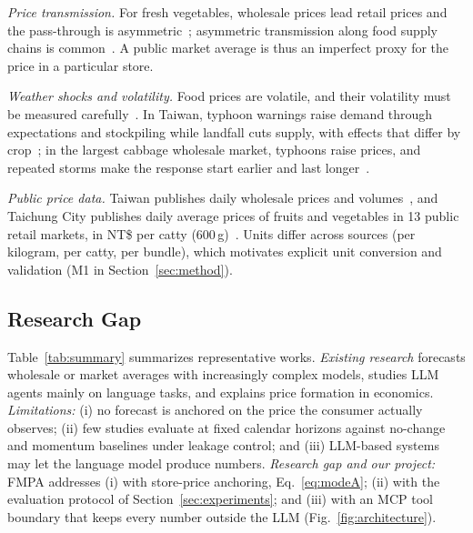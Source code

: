 \textit{Price transmission.} For fresh vegetables, wholesale prices lead retail
prices and the pass-through is asymmetric~\cite{ward1982asymmetry}; asymmetric
transmission along food supply chains is common~\cite{meyer2004asymmetric}. A
public market average is thus an imperfect proxy for the price in a particular
store.

\textit{Weather shocks and volatility.} Food prices are volatile, and their
volatility must be measured carefully~\cite{gilbert2010food}. In Taiwan,
typhoon warnings raise demand through expectations and stockpiling while
landfall cuts supply, with effects that differ by crop~\cite{yu2022market}; in
the largest cabbage wholesale market, typhoons raise prices, and repeated
storms make the response start earlier and last longer~\cite{su2025food}.

\textit{Public price data.} Taiwan publishes daily wholesale prices and
volumes~\cite{moa2026trans}, and Taichung City publishes daily average prices
of fruits and vegetables in 13 public retail markets, in NT\$ per catty
(600\,g)~\cite{taichung2026retail}. Units differ across sources (per kilogram,
per catty, per bundle), which motivates explicit unit conversion and validation (M1 in
Section~\ref{sec:method}).

\subsection{Research Gap}
Table~\ref{tab:summary} summarizes representative works.
\textit{Existing research} forecasts wholesale or market averages with
increasingly complex models, studies LLM agents mainly on language tasks, and
explains price formation in economics. \textit{Limitations:} (i) no forecast is
anchored on the price the consumer actually observes; (ii) few studies evaluate
at fixed calendar horizons against no-change and momentum baselines under
leakage control; and (iii) LLM-based systems may let the language model
produce numbers. \textit{Research gap and our project:} FMPA addresses (i)
with store-price anchoring, Eq.~\eqref{eq:modeA}; (ii) with the evaluation
protocol of Section~\ref{sec:experiments}; and (iii) with an MCP tool boundary
that keeps every number outside the LLM (Fig.~\ref{fig:architecture}).


